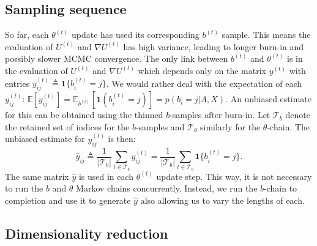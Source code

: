 \subsection{Sampling sequence}
\label{s:ss}

So far, each $\theta^{(t)}$ update has used its corresponding $b^{(t)}$ sample. This means the evaluation of $U^{(t)}$ and $\nabla U^{(t)}$ has high variance, leading to longer burn-in and possibly slower MCMC convergence. The only link between $b^{(t)}$ and $\theta^{(t)}$ is in the evaluation of $U^{(t)}$ and $\nabla U^{(t)}$ which depends only on the matrix $y^{(t)}$ with entries $y_{ij}^{(t)} \triangleq \boldsymbol{1}\{b_i^{(t)} = j\}$. We would rather deal with the expectation of each $y_{ij}^{(t)}$:
$
	\mathbb{E} \left[ y_{ij}^{(t)} \right] = \mathbb{E}_{b^{(t)}} \left[ \boldsymbol{1} \left( b_{i}^{(t)} = j \right) \right]
	= p(b_i = j | A, X).
$
An unbiased estimate for this can be obtained using 
the thinned $b$-samples after burn-in.
Let $\mathcal{T}_b$  denote the retained set of indices 
for the $b$-samples and $\mathcal{T}_\theta$ similarly for the $\theta$-chain. 
The unbiased estimate for $y_{ij}^{(t)}$ is then:
%
\begin{equation}
	\hat{y}_{ij} \triangleq \frac{1}{|\mathcal{T}_b|} \sum_{t \in \mathcal{T}_b} y_{ij}^{(t)} = \frac{1}{|\mathcal{T}_b|} \sum_{t \in \mathcal{T}_b} \boldsymbol{1}\{b_i^{(t)} = j\}.
	\label{eqn:y-hat}
\end{equation}
%
The same matrix $\hat{y}$ is used in each $\theta^{(t)}$ update step.
This way, it is not necessary to run the $b$ and $\theta$ Markov chains 
concurrently. Instead, we run the $b$-chain to completion and use it 
to generate $\hat{y}$ also allowing us to vary the lengths of each.

\subsection{Dimensionality reduction}
\label{sec:dim-reduction}

